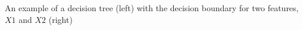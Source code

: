 An example of a decision tree (left) with the decision boundary for two features, $X1$ and $X2$ (right)
\label{fig:decisiontree}
